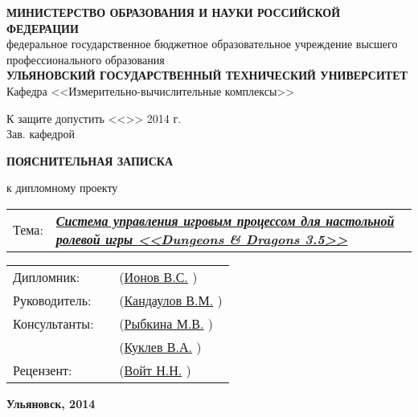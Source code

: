 


\small
\begin{center}

\MakeTextUppercase{\textbf{министерство образования и науки российской федерации}}\\
федеральное государственное бюджетное образовательное учреждение высшего профессионального образования\\
\MakeTextUppercase{\textbf{ульяновский государственный технический университет}}\\[0.7cm]

Кафедра <<Измерительно-вычислительные комплексы>>\\[0.7cm]

\begin{flushright}

К защите допустить <<\underline{\hspace{1cm}}>>\underline{\hspace{2.5cm}} 2014 г.\\
Зав. кафедрой \underline{\hspace{3.5cm}}

\end{flushright}

\vspace{1.5cm}

\LARGE

\textbf{ПОЯСНИТЕЛЬНАЯ ЗАПИСКА}

\Large

к дипломному проекту\\[0.7cm]

\normalsize

\begin{tabular}{p{1cm} p{13.5cm}}
Тема: & \textbf{\textit{\uline{Система управления игровым процессом для настольной ролевой игры <<Dungeons \& Dragons 3.5>>\hfill}}}
\end{tabular}

\vspace{2cm}

\begin{tabular}{p{3cm} p{6cm} p{5cm}}
    Дипломник:    & \uline{\hfill} & (\uline{Ионов В.С.\hfill}     )  \\[0.5cm]
    Руководитель: & \uline{\hfill} & (\uline{Кандаулов В.М.\hfill} )  \\[0.5cm]
    Консультанты: & \uline{\hfill} & (\uline{Рыбкина М.В.\hfill}   )  \\[0.5cm]
                  & \uline{\hfill} & (\uline{Куклев В.А.\hfill}    )  \\[0.5cm]
    Рецензент:    & \uline{\hfill} & (\uline{Войт Н.Н.\hfill}      )  \\
\end{tabular}

\vfill

\textbf{Ульяновск, 2014}

\end{center}


\restoregeometry
